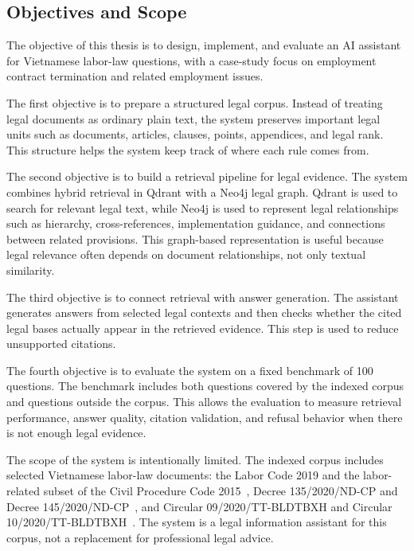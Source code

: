\subsection{Objectives and Scope}
The objective of this thesis is to design, implement, and evaluate an AI assistant for Vietnamese labor-law questions, with a case-study focus on employment contract termination and related employment issues.

The first objective is to prepare a structured legal corpus. Instead of treating legal documents as ordinary plain text, the system preserves important legal units such as documents, articles, clauses, points, appendices, and legal rank. This structure helps the system keep track of where each rule comes from.

The second objective is to build a retrieval pipeline for legal evidence. The system combines hybrid retrieval in Qdrant with a Neo4j legal graph. Qdrant is used to search for relevant legal text, while Neo4j is used to represent legal relationships such as hierarchy, cross-references, implementation guidance, and connections between related provisions. This graph-based representation is useful because legal relevance often depends on document relationships, not only textual similarity.

The third objective is to connect retrieval with answer generation. The assistant generates answers from selected legal contexts and then checks whether the cited legal bases actually appear in the retrieved evidence. This step is used to reduce unsupported citations.

The fourth objective is to evaluate the system on a fixed benchmark of 100 questions. The benchmark includes both questions covered by the indexed corpus and questions outside the corpus. This allows the evaluation to measure retrieval performance, answer quality, citation validation, and refusal behavior when there is not enough legal evidence.

The scope of the system is intentionally limited. The indexed corpus includes selected Vietnamese labor-law documents: the Labor Code 2019 and the labor-related subset of the Civil Procedure Code 2015~\cite{vietnam2019laborcode,vietnam2015civilprocedure}, Decree 135/2020/ND-CP and Decree 145/2020/ND-CP~\cite{vietnam2020decree135,vietnam2020decree145}, and Circular 09/2020/TT-BLDTBXH and Circular 10/2020/TT-BLDTBXH~\cite{vietnam2020circular09,vietnam2020circular10}. The system is a legal information assistant for this corpus, not a replacement for professional legal advice.

